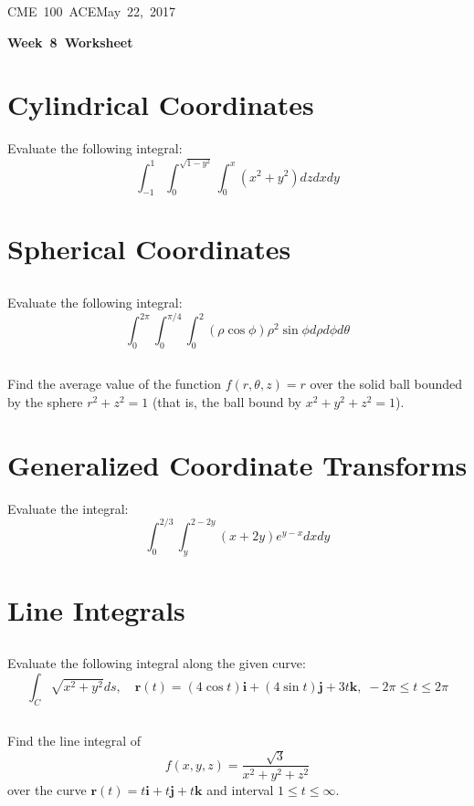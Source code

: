\documentclass[letterpaper, 11pt]{article}
\makeatletter
\newcommand{\hmwkTitle}{Week\ 8\ Worksheet} %
\newcommand{\hmwkClass}{CME\ 100\ ACE} %
\newcommand{\hmwkAuthorName}{Timothy Anderson} %
\newcommand{\hmwkAuthorEmail}{timmya@stanford.edu} %
\makeatother
\begin{document}
\noindent
\normalsize 
\hmwkClass \hfill May\ 22,\ 2017\\

\begin{center} \Large \textbf{\hmwkTitle} \end{center}

\section{Cylindrical Coordinates}
Evaluate the following integral:
\[ \int_{-1}^1 \int_0^{\sqrt{1 - y^2}} \int_0^x (x^2 + y^2) dz dx dy \]

\section{Spherical Coordinates}
\subsection{} Evaluate the following integral:
\[ \int_0^{2\pi} \int_0^{\pi/4} \int_0^2 (\rho \cos \phi) \rho^2 \sin \phi d \rho d \phi d \theta \]

\subsection{} Find the average value of the function $f(r, \theta, z) = r$ over the solid ball bounded by the sphere $r^2 + z^2 = 1$ (that is, the ball bound by $x^2 + y^2 + z^2 = 1$). 

\section{Generalized Coordinate Transforms}
Evaluate the integral:
\[ \int_0^{2/3} \int_y^{2 - 2y}(x + 2y)e^{y-x}dx dy \]

\section{Line Integrals}
\subsection{} Evaluate the following integral along the given curve:
\[ \int_C \sqrt{x^2 + y^2}ds, \quad \bm{r}(t) = (4 \cos t) \bm{i} + (4 \sin t) \bm{j} + 3t \bm{k},\; - 2\pi\leq t \leq 2 \pi\]

\subsection{} Find the line integral of 
\[ f(x,y, z) = \frac{\sqrt{3}}{x^2 + y^2 + z^2}\] 
over the curve $\bm{r}(t) = t \bm{i} + t\bm{j} + t\bm{k}$ and interval $1 \leq t \leq \infty$.
\end{document}
